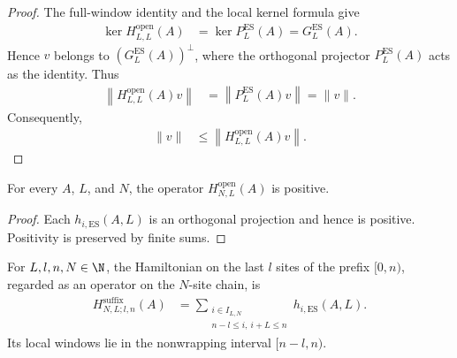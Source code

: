 \begin{proof}
    \leanok
    The full-window identity and the local kernel formula give
    \begin{align}
        \ker H^{\mathrm{open}}_{L,L}(A)
         & =\ker P_L^{\mathrm{ES}}(A)=G_L^{\mathrm{ES}}(A).
    \end{align}
    Hence $v$ belongs to $(G_L^{\mathrm{ES}}(A))^\perp$, where the orthogonal
    projector $P_L^{\mathrm{ES}}(A)$ acts as the identity. Thus
    \begin{align}
        \left\lVert H^{\mathrm{open}}_{L,L}(A)v\right\rVert
         & =\left\lVert P_L^{\mathrm{ES}}(A)v\right\rVert
        =\lVert v\rVert.
    \end{align}
    Consequently,
    \begin{align}
        \lVert v\rVert
         & \leq\left\lVert H^{\mathrm{open}}_{L,L}(A)v\right\rVert.
    \end{align}
\end{proof}

\begin{lemma}
    \label{lem:open_parent_hamiltonian_es_positive}
    \leanok
    For every $A$, $L$, and $N$, the operator
    $H^{\mathrm{open}}_{N,L}(A)$ is positive.
\end{lemma}

\begin{proof}
    \leanok
    Each $h_{i,\mathrm{ES}}(A,L)$ is an orthogonal projection and hence is
    positive. Positivity is preserved by finite sums.
\end{proof}

\begin{definition}
    \label{def:open_suffix_parent_hamiltonian_es}
    For $L,l,n,N\in\N$, the Hamiltonian on the last $l$ sites of the prefix
    $[0,n)$, regarded as an operator on the $N$-site chain, is
    \begin{align}
        H^{\mathrm{suffix}}_{N,L;l,n}(A)
         & =\sum_{\substack{i\in I_{L,N} \\ n-l\leq i,\ i+L\leq n}}
        h_{i,\mathrm{ES}}(A,L).
        \label{eq:open_suffix_parent_hamiltonian_es}
    \end{align}
    Its local windows lie in the nonwrapping interval $[n-l,n)$.
\end{definition}

